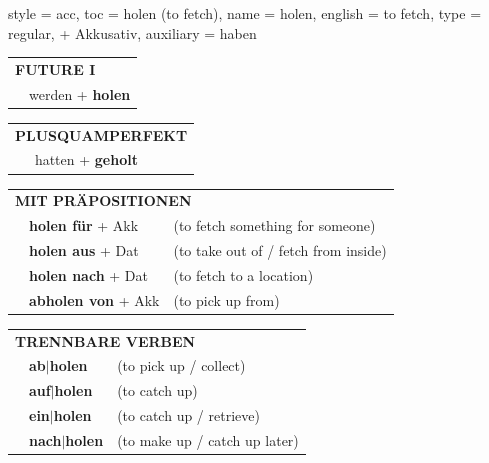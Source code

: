 \begin{verbentry}{
  style = {acc},
  toc = {holen (to fetch)},
  name = {holen},
  english = {to fetch},
  type = {regular, + Akkusativ},
  auxiliary = {haben}
}
\begin{tabular}{rl}
    \multicolumn{2}{l}{\textbf{FUTURE I} }\\
   & werden + \textbf{holen}\\
 
  \end{tabular}
\hfill
   \begin{tabular}{rl}
      \multicolumn{2}{l}{\textbf{PLUSQUAMPERFEKT}}\\
   & hatten + \textbf{geholt}\\
  \end{tabular}
  
  \vspace{10pt}

   \begin{tabular}{lll}
      \multicolumn{3}{l}{\textbf{MIT PRÄPOSITIONEN}}\\
& \textbf{holen für} + Akk & (to fetch something for someone)\\
& \textbf{holen aus} + Dat & (to take out of / fetch from inside)\\
&\textbf{holen nach} + Dat & (to fetch to a location)\\
&\textbf{abholen von} + Akk & (to pick up from)
  \end{tabular}
  \hfill
   \begin{tabular}{lll}
      \multicolumn{3}{l}{\textbf{TRENNBARE VERBEN}}\\
 & \textbf{ab$|$holen} & (to pick up / collect)\\
 & \textbf{auf$|$holen} & (to catch up)\\
     & \textbf{ein$|$holen} & (to catch up / retrieve)\\
     & \textbf{nach$|$holen} & (to make up / catch up later)
  \end{tabular}


  \vspace{-5pt}
\end{verbentry}

